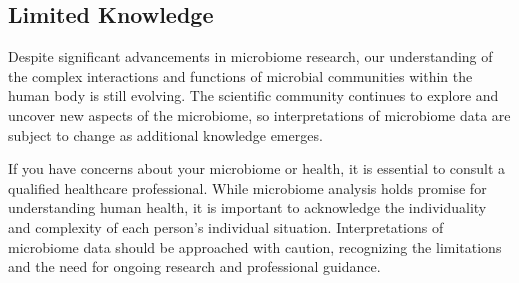 \documentclass[
]{article}
\begin{document}
\subsection{Limited Knowledge}
\begin{small}
Despite significant advancements in microbiome research, our understanding of
the complex interactions and functions of microbial communities within the human
body is still evolving. The scientific community continues to explore and
uncover new aspects of the microbiome, so interpretations of
microbiome data are subject to change as additional knowledge emerges.

If you have concerns about your microbiome or health, it is essential to consult
a qualified healthcare professional. While microbiome analysis holds promise for
understanding human health, it is important to acknowledge the individuality and
complexity of each person's individual situation. Interpretations of microbiome
data should be approached with caution, recognizing the limitations and the need
for ongoing research and professional guidance.
\end{small}
\end{document}

